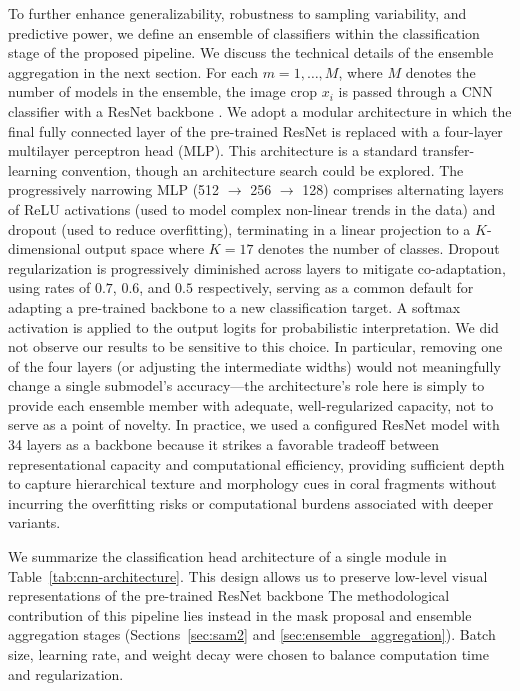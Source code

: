 \documentclass[11pt]{elsarticle}
\begin{document}
To further enhance generalizability, robustness to sampling variability, and predictive power, we define an ensemble of classifiers within the classification stage of the proposed pipeline. We discuss the technical details of the ensemble aggregation in the next section. For each $m = 1, \ldots, M$, where $M$ denotes the number of models in the ensemble, the image crop $x_i$ is passed through a CNN classifier with a ResNet backbone \citep{he2016deep}. We adopt a modular architecture in which the final fully connected layer of the pre-trained ResNet is replaced with a four-layer multilayer perceptron head (MLP). This architecture is a standard transfer-learning convention, though an architecture search could be explored. The progressively narrowing MLP (512 $\to$ 256 $\to$ 128) comprises alternating layers of ReLU activations (used to model complex non-linear trends in the data) and dropout (used to reduce overfitting), terminating in a linear projection to a $K$-dimensional output space where $K = 17$ denotes the number of classes. Dropout regularization is progressively diminished across layers to mitigate co-adaptation, using rates of $0.7$, $0.6$, and $0.5$ respectively, serving as a common default for adapting a pre-trained backbone to a new classification target. A softmax activation is applied to the output logits for probabilistic interpretation. We did not observe our results to be sensitive to this choice. In particular, removing one of the four layers (or adjusting the intermediate widths) would not meaningfully change a single submodel's accuracy---the architecture's role here is simply to provide each ensemble member with adequate, well-regularized capacity, not to serve as a point of novelty. In practice, we used a configured ResNet model with 34 layers as a backbone because it strikes a favorable tradeoff between representational capacity and computational efficiency, providing sufficient depth to capture hierarchical texture and morphology cues in coral fragments without incurring the overfitting risks or computational burdens associated with deeper variants.

We summarize the classification head architecture of a single module in Table~\ref{tab:cnn-architecture}. This design allows us to preserve low-level visual representations of the pre-trained ResNet backbone The methodological contribution of this pipeline lies instead in the mask proposal and ensemble aggregation stages (Sections~\ref{sec:sam2} and \ref{sec:ensemble_aggregation}). Batch size, learning rate, and weight decay were chosen to balance computation time and regularization.
\end{document}
